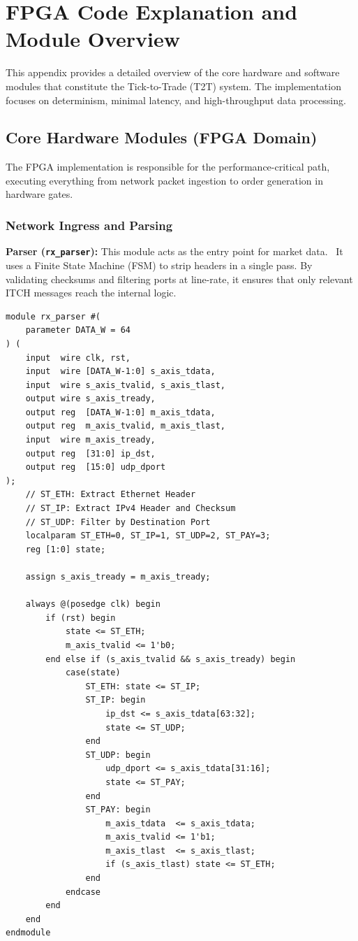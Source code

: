 \chapter{FPGA Code Explanation and Module Overview}
\label{sec:codeexplain}

This appendix provides a detailed overview of the core hardware and software modules that constitute the Tick-to-Trade (T2T) system. The implementation focuses on determinism, minimal latency, and high-throughput data processing.

\section{Core Hardware Modules (FPGA Domain)}

The FPGA implementation is responsible for the performance-critical path, executing everything from network packet ingestion to order generation in hardware gates.

\subsection{Network Ingress and Parsing}
\textbf{Parser (\texttt{rx\_parser}):} This module acts as the entry point for market data. \datamethodology\ It uses a Finite State Machine (FSM) to strip headers in a single pass. By validating checksums and filtering ports at line-rate, it ensures that only relevant ITCH messages reach the internal logic.

\begin{lstlisting}[style=verilogstyle, caption={Minimal RX L2/L3/L4 parser for UDP market data}, label={lst:parser_a}]
module rx_parser #(
    parameter DATA_W = 64
) (
    input  wire clk, rst,
    input  wire [DATA_W-1:0] s_axis_tdata,
    input  wire s_axis_tvalid, s_axis_tlast,
    output wire s_axis_tready,
    output reg  [DATA_W-1:0] m_axis_tdata,
    output reg  m_axis_tvalid, m_axis_tlast,
    input  wire m_axis_tready,
    output reg  [31:0] ip_dst,
    output reg  [15:0] udp_dport
);
    // ST_ETH: Extract Ethernet Header
    // ST_IP: Extract IPv4 Header and Checksum
    // ST_UDP: Filter by Destination Port
    localparam ST_ETH=0, ST_IP=1, ST_UDP=2, ST_PAY=3;
    reg [1:0] state;

    assign s_axis_tready = m_axis_tready;

    always @(posedge clk) begin
        if (rst) begin
            state <= ST_ETH;
            m_axis_tvalid <= 1'b0;
        end else if (s_axis_tvalid && s_axis_tready) begin
            case(state)
                ST_ETH: state <= ST_IP;
                ST_IP: begin
                    ip_dst <= s_axis_tdata[63:32];
                    state <= ST_UDP;
                end
                ST_UDP: begin
                    udp_dport <= s_axis_tdata[31:16];
                    state <= ST_PAY;
                end
                ST_PAY: begin
                    m_axis_tdata  <= s_axis_tdata;
                    m_axis_tvalid <= 1'b1;
                    m_axis_tlast  <= s_axis_tlast;
                    if (s_axis_tlast) state <= ST_ETH;
                end
            endcase
        end
    end
endmodule
\end{lstlisting}

